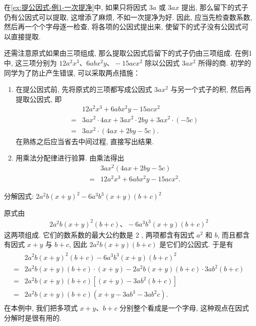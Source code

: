 \begin{note}
	在\autoref{ex:提公因式-例1-一次提净}中, 如果只将因式 $3 a$ 或 $3 a x$ 提出, 那么留下的式子仍有公因式可以提取, 这增添了麻烦, 不如一次提净为好. 因此, 应当先检查数系数, 然后再一个个字母逐一检查, 将各项的公因式提出来, 使留下的式子没有公因式可以直接提取.

	还需注意原式如果由三项组成, 那么提取公因式后留下的式子仍由三项组成. 在例1 中, 这三项分别为 $12 a^{2} x^{3} 、 6 a b x^{2} y 、-15 a c x^{2}$ 除以公因式 $3 a x^{2}$ 所得的商. 初学的同学为了防止产生错误, 可以采取两点措施：

	\begin{enumerate}
		\item 在提公因式前, 先将原式的三项都写成公因式 $3 a x^{2}$ 与另一个式子的积, 然后再提取公因式, 即
		      \begin{align*}
			        & 12 a^{2} x^{3}+6 a b x^{2} y-15 a c x^{2}                         \\
			      = & 3 a x^{2} \cdot 4 a x+3 a x^{2} \cdot 2 b y+3 a x^{2} \cdot(-5 c) \\
			      = & 3 a x^{2} \cdot(4 a x+2 b y-5 c) .
		      \end{align*}
		      在熟练之后应当省去中间过程, 直接写出结果.
		\item 用乘法分配律进行验算. 由乘法得出
		      \begin{align*}
			        & 3 a x^{2}(4 a x+2 b y-5 c)                  \\
			      = & 12 a^{2} x^{3}+6 a b x^{2} y-15 a c x^{2} .
		      \end{align*}
	\end{enumerate}
\end{note}

\begin{example}[视“多”为一]\label{ex:提公因式-例2-一次提净}
	分解因式: $2 a^{2} b(x+y)^{2}-6 a^{3} b^{3}(x+y)(b+c)^{2}$
\end{example}
\begin{solution}
	原式由
	\begin{align*}
		2 a^{2} b(x+y)^{2}(b+c) 、-6 a^{3} b^{3}(x+y)(b+c)^{2}
	\end{align*}
	这两项组成. 它们的数系数的最大公约数是 2 , 两项都含有因式 $a^{2}$ 和 $b$, 而且都含有因式 $x+y$ 与 $b+c$, 因此 $2 a^{2} b(x+y)(b+c)$ 是它们的公因式. 于是有
	\begin{align*}
		\begin{aligned}
			  & 2 a^{2} b(x+y)^{2}(b+c)-6 a^{3} b^{3}(x+y)(b+c)^{2}                     \\
			= & 2 a^{2} b(x+y)(b+c) \cdot(x+y)-2 a^{2} b(x+y)(b+c) \cdot 3 a b^{2}(b+c) \\
			= & 2 a^{2} b(x+y)(b+c)\left[(x+y)-3 a b^{2}(b+c)\right]                    \\
			= & 2 a^{2} b(x+y)(b+c)\left(x+y-3 a b^{3}-3 a b^{2} c\right) .
		\end{aligned}
	\end{align*}
	在本例中, 我们把多项式 $x+y 、 b+c$ 分别整个看成是一个字母, 这种观点在因式分解时是很有用的.
\end{solution}

